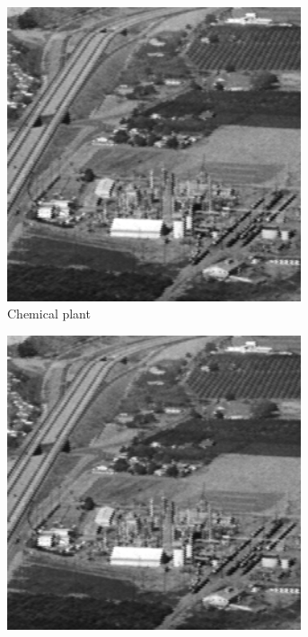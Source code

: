 \begin{figure}
\begin{subfigure}[b]{.23\textwidth}
  \centering
  \includegraphics[width=0.95\textwidth]{figures/test-images/original/chemicalplant}
  \caption{Chemical plant}
  \label{fig:test-images-chemicalplant-original}
\end{subfigure}
\begin{subfigure}[b]{.23\textwidth}
  \centering
  \includegraphics[width=0.95\textwidth]{figures/test-images/truncate1/chemicalplant}

\end{subfigure}
\end{figure}
